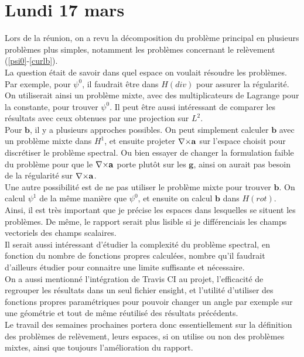 \section{Lundi 17 mars}

Lors de la réunion, on a revu la décomposition du problème principal en plusieurs problèmes plus simples, notamment les problèmes concernant le relèvement (\ref{psi0}-\ref{curlb}).\\
La question était de savoir dans quel espace on voulait résoudre les problèmes. Par exemple, pour $\psi^0$, il faudrait être dans $H(div)$ pour assurer la régularité. On utiliserait ainsi un problème mixte, avec des multiplicateurs de Lagrange pour la constante, pour trouver $\psi^0$. Il peut être aussi intéressant de comparer les résultats avec ceux obtenues par une projection sur $L^2$.\\

Pour $\mathbf{b}$, il y a plusieurs approches possibles. On peut simplement calculer $\mathbf{b}$ avec un problème mixte dans $H^1$, et ensuite projeter ${\nabla\times}\mathbf{a}$ sur l’espace choisit pour discrétiser le problème spectral. Ou bien essayer de changer la formulation faible du problème pour que le ${\nabla\times}\mathbf{a}$ porte plutôt sur les $\mathbf{g}$, ainsi on aurait pas besoin de la  régularité sur ${\nabla\times}\mathbf{a}$.\\
Une autre possibilité est de ne pas utiliser le problème mixte pour trouver $\mathbf{b}$. On calcul $\psi^1$ de la même manière que $\psi^0$, et ensuite on calcul $\mathbf{b}$ dans $H(rot)$.\\

Ainsi, il est très important que je précise les espaces dans lesquelles se situent les problèmes. De même, le rapport serait plus lisible si je différenciais les champs vectoriels des champs scalaires.\\
Il serait aussi intéressant d’étudier la complexité du problème spectral, en fonction du nombre de fonctions propres calculées, nombre qu’il  faudrait d’ailleurs étudier pour connaitre une limite suffisante et nécessaire.\\

On a aussi mentionné l’intégration de Travis CI au projet, l’efficacité de regrouper les résultats dans un seul fichier ensight, et l’utilité d’utiliser des fonctions propres paramétriques pour pouvoir changer un angle par exemple sur une géométrie et tout de même réutilisé des résultats précédents.\\

Le travail des semaines prochaines portera donc essentiellement sur la définition des problèmes de relèvement, leurs espaces, si on utilise ou non des problèmes mixtes, ainsi que toujours l’amélioration du rapport.

